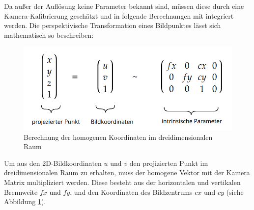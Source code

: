 \documentclass[12pt, ngerman]{article}
\begin{document}
Da außer der Auflösung keine Parameter bekannt sind, müssen diese durch eine Kamera-Kalibrierung geschätzt und in folgende Berechnungen mit integriert werden. Die perspektivische Transformation eines Bildpunktes lässt sich mathematisch so beschreiben:
\begin{figure}[hbtp!]
    \includegraphics[width=\textwidth]{camera_matrix.png}
    \caption{Berechnung der homogenen Koordinaten im dreidimensionalen Raum}
    \label{Abb: camera_matrix}
\end{figure}

Um aus den 2D-Bildkoordinaten $u$ und $v$ den projizierten Punkt im dreidimensionalen Raum zu erhalten, muss der homogene Vektor mit der Kamera Matrix multipliziert werden. Diese besteht aus der horizontalen und vertikalen Brennweite $fx$ und $fy$, und den Koordinaten des Bildzentrums $cx$ und $cy$ (siehe Abbildung \ref{Abb: camera_matrix}).

\end{document}
